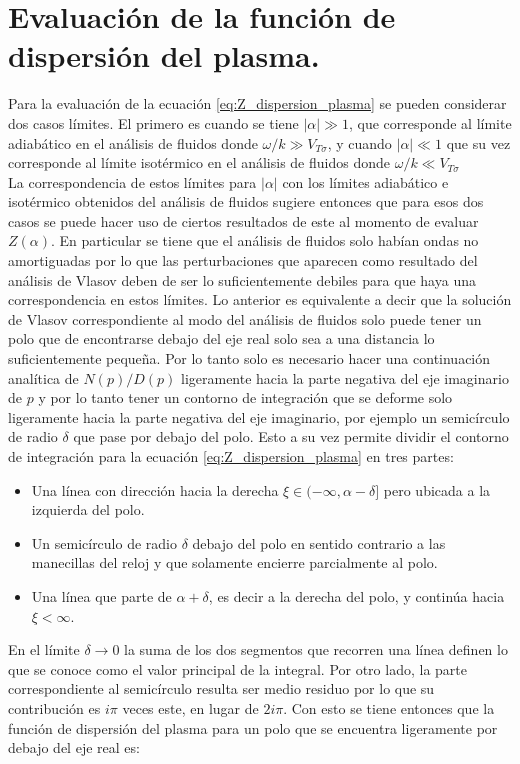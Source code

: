 \documentclass[../tesis_main_file.tex]{subfiles}
\begin{document}
\section{Evaluación de la función de dispersión del plasma.}
Para la evaluación de la ecuación \ref{eq:Z_dispersion_plasma} se pueden considerar dos casos límites. El primero es cuando se tiene $|\alpha|\gg 1$, que corresponde al límite adiabático en el análisis de fluidos donde $\omega / k \gg V_{T\sigma}$, y cuando $|\alpha|\ll 1$ que su vez corresponde al límite isotérmico en el análisis de fluidos donde $\omega / k \ll V_{T\sigma}$\\
La correspondencia de estos límites para $|\alpha |$ con los límites adiabático e isotérmico obtenidos del análisis de fluidos sugiere entonces que para esos dos casos se puede hacer uso de ciertos resultados de este al momento de evaluar $Z(\alpha )$. En particular se tiene que el análisis de fluidos solo habían ondas no amortiguadas por lo que las perturbaciones que aparecen como resultado del análisis de Vlasov deben de ser lo suficientemente debiles para que haya una correspondencia en estos límites. Lo anterior es equivalente a decir que la solución de Vlasov correspondiente al modo del análisis de fluidos solo puede tener un polo que de encontrarse debajo del eje real solo sea a una distancia lo suficientemente pequeña. Por lo tanto solo es necesario hacer una continuación analítica de $N(p)/D(p)$ ligeramente hacia la parte negativa del eje imaginario de $p$ y por lo tanto tener un contorno de integración que se deforme solo ligeramente hacia la parte negativa del eje imaginario, por ejemplo un semicírculo de radio $\delta$ que pase por debajo del polo. Esto a su vez permite dividir el contorno de integración para la ecuación \ref{eq:Z_dispersion_plasma} en tres partes:
\begin{itemize}
\item Una línea con dirección hacia la derecha $\xi \in (-\infty , \alpha -\delta ]$ pero ubicada a la izquierda del polo.
\item Un semicírculo de radio $\delta$ debajo del polo en sentido contrario a las manecillas del reloj y que solamente encierre parcialmente al polo.
\item Una línea que parte de $\alpha +\delta$, es decir a la derecha del polo, y continúa hacia $\xi < \infty$.
\end{itemize}
En el límite $\delta \to 0$ la suma de los dos segmentos que recorren una línea definen lo que se conoce como el valor principal de la integral. Por otro lado, la parte correspondiente al semicírculo resulta ser medio residuo por lo que su contribución es $i\pi$ veces este, en lugar de $2i\pi$. Con esto se tiene entonces que la función de dispersión del plasma para un polo que se encuentra ligeramente por debajo del eje real es:
\end{document}

